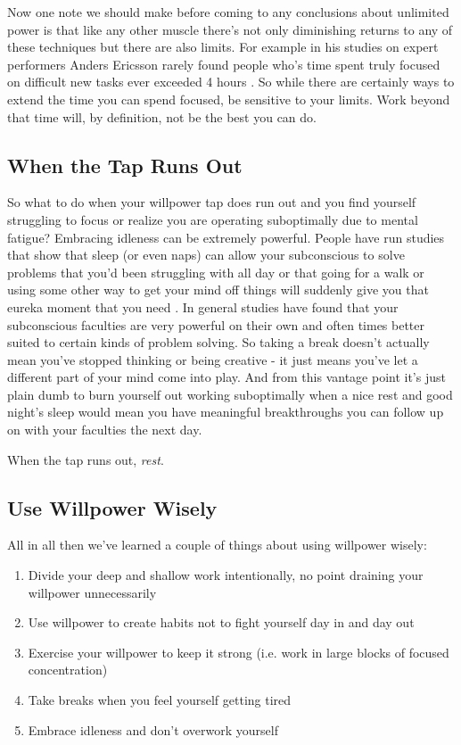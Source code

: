 \documentclass[11pt,a5paper]{book}
\begin{document}
Now one note we should make before coming to any conclusions about unlimited power is that like any other muscle there's not only diminishing returns to any of these techniques but there are also limits. For example in his studies on expert performers Anders Ericsson rarely found people who's time spent truly focused on difficult new tasks ever exceeded 4 hours \cite{newport}. So while there are certainly ways to extend the time you can spend focused, be sensitive to your limits. Work beyond that time will, by definition, not be the best you can do.

\subsection{When the Tap Runs Out}
So what to do when your willpower tap does run out and you find yourself struggling to focus or realize you are operating suboptimally due to mental fatigue? Embracing idleness can be extremely powerful. People have run studies that show that sleep (or even naps) can allow your subconscious to solve problems that you'd been struggling with all day \cite{kaufman} or that going for a walk or using some other way to get your mind off things will suddenly give you that eureka moment that you need \cite{newport}. In general studies have found that your subconscious faculties are very powerful on their own and often times better suited to certain kinds of problem solving. So taking a break doesn't actually mean you've stopped thinking or being creative - it just means you've let a different part of your mind come into play. And from this vantage point it's just plain dumb to burn yourself out working suboptimally when a nice rest and good night's sleep would mean you have meaningful breakthroughs you can follow up on with your faculties the next day.
\newline

When the tap runs out, \textit{rest}.

\subsection{Use Willpower Wisely}
All in all then we've learned a couple of things about using willpower wisely:
\begin{enumerate}
\item Divide your deep and shallow work intentionally, no point draining your willpower unnecessarily
\item Use willpower to create habits not to fight yourself day in and day out
\item Exercise your willpower to keep it strong (i.e. work in large blocks of focused concentration)
\item Take breaks when you feel yourself getting tired 
\item Embrace idleness and don't overwork yourself
\end{enumerate}
\end{document}

